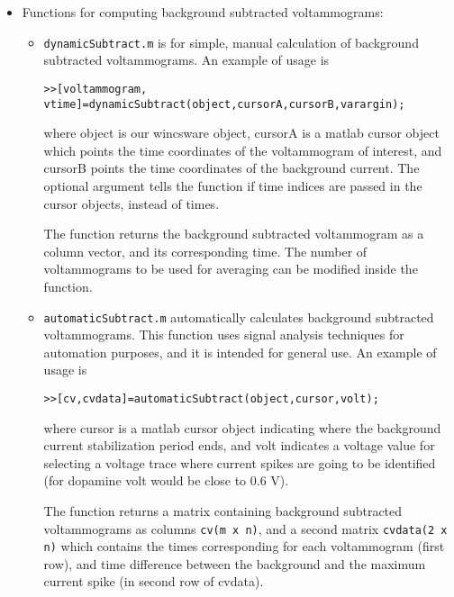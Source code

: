 \documentclass{article}
\begin{document}
\begin{itemize}
\item Functions for computing background subtracted voltammograms:


  \begin{itemize}
  \item \verb|dynamicSubtract.m| is for simple, manual calculation of background subtracted voltammograms. An example of usage is 
  
  \verb|>>[voltammogram, vtime]=dynamicSubtract(object,cursorA,cursorB,varargin);|
  
  where \textsf{object} is our wincsware object, \textsf{cursorA} is a matlab cursor object which points the time coordinates of the voltammogram of interest, and \textsf{cursorB} points the time coordinates of the background current. The optional argument tells the function if time indices are passed in the cursor objects, instead of times. 
  
  The function returns the background subtracted voltammogram as a column vector, and its corresponding time. The number of voltammograms to be used for averaging can be modified inside the function. 
  
  \item \verb|automaticSubtract.m| automatically calculates background subtracted voltammograms. This function uses signal analysis techniques for automation purposes, and it is intended for general use. An example of usage is 
  
  \verb|>>[cv,cvdata]=automaticSubtract(object,cursor,volt);|
  
  where \textsf{cursor} is a matlab cursor object indicating where the background current stabilization period ends, and \textsf{volt} indicates a voltage value for selecting a voltage trace where current spikes are going to be identified (for dopamine \textsf{volt} would be close to 0.6 V).
  
  The function returns a matrix containing background subtracted voltammograms as columns \verb|cv(m x n)|, and a second matrix \verb|cvdata(2 x n)| which contains the times corresponding for each voltammogram (first row), and time difference between the background and the maximum current spike (in second row of cvdata). 
  

\end{itemize}
\end{itemize}
\end{document}
